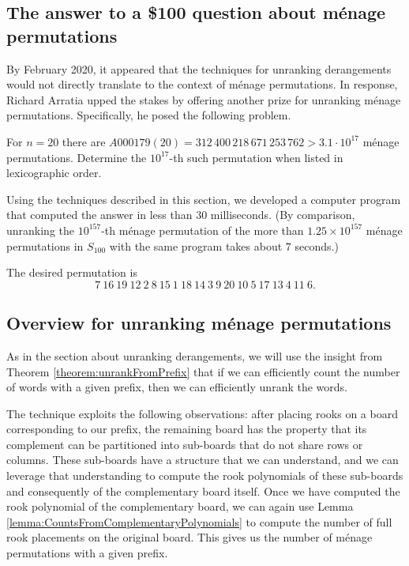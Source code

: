 \subsection{The answer to a \$100 question about m\'enage permutations}
By February 2020, it appeared that the techniques for unranking derangements
would not directly translate to the context of m\'enage permutations. In
response, Richard Arratia upped the stakes by offering another prize for
unranking m\'enage permutations. Specifically, he posed the following problem.
\begin{problem}
  For $n=20$ there are $A000179(20) = 312\,400\,218\,671\,253\,762 > 3.1\cdot 10^{17}$
  m\'enage permutations.
  Determine the $10^{17}$-th such permutation when listed in lexicographic order.
\end{problem}
Using the techniques described in this section, we developed a computer program that
computed the answer in less than $30$ milliseconds.
(By comparison, unranking the $10^{157}$-th m\'enage permutation of the more
than $1.25 \times 10^{157}$ m\'enage permutations in $S_{100}$
with the same program takes about $7$ seconds.)
\begin{answer}
  The desired permutation is \begin{equation}
    7\ 16\ 19\ 12\ 2\ 8\ 15\ 1\ 18\ 14\ 3\ 9\ 20\ 10\ 5\ 17\ 13\ 4\ 11\ 6.
  \end{equation}
\end{answer}

\subsection{Overview for unranking m\'enage permutations}

As in the section about unranking derangements, we will use the insight from
Theorem \ref{theorem:unrankFromPrefix} that if we can efficiently count the number
of words with a given prefix, then we can efficiently unrank the words.

The technique exploits the following observations:
after placing rooks on a board corresponding to our
prefix, the remaining board has the property that its complement
can be partitioned into sub-boards that do not share rows or columns.
These sub-boards have a structure that we can understand,
and we can leverage that understanding to compute the rook polynomials of these
sub-boards and consequently of the complementary board itself. Once we have computed
the rook polynomial of the complementary board, we can again use
Lemma \ref{lemma:CountsFromComplementaryPolynomials}
to compute the number of full rook placements on the original board.
This gives us the number of m\'enage permutations with a given prefix.

